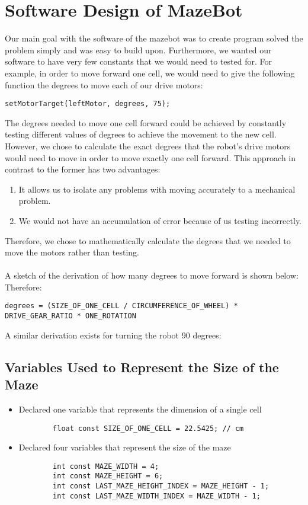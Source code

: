 \documentclass[11pt]{article}
\begin{document}
\section{Software Design of MazeBot}
Our main goal with the software of the mazebot was to create program solved the problem simply and was easy to build upon. Furthermore, we wanted our software to have very few constants that we would need to tested for. For example, in order to move forward one cell, we would need to give the following function the degrees to move each of our drive motors:
\begin{verbatim}
setMotorTarget(leftMotor, degrees, 75);
\end{verbatim}
The degrees needed to move one cell forward could be achieved by constantly testing different values of degrees to achieve the movement to the new cell. However, we chose to calculate the exact degrees that the robot's drive motors would need to move in order to move exactly one cell forward. This approach in contrast to the former has two advantages: 
\begin{enumerate}
\item It allows us to isolate any problems with moving accurately to a mechanical problem.
\item We would not have an accumulation of error because of us testing incorrectly.
\end{enumerate}
Therefore, we chose to mathematically calculate the degrees that we needed to move the motors rather than testing.\\\\
A sketch of the derivation of how many degrees to move forward is shown below: %
\\
Therefore:
\begin{verbatim}
degrees = (SIZE_OF_ONE_CELL / CIRCUMFERENCE_OF_WHEEL) * DRIVE_GEAR_RATIO * ONE_ROTATION
\end{verbatim}
A similar derivation exists for turning the robot 90 degrees: %








\subsection{Variables Used to Represent the Size of the Maze}
\begin{itemize}
\item Declared one variable that represents the dimension of a single cell
	\begin{verbatim}
		float const SIZE_OF_ONE_CELL = 22.5425; // cm 	
	\end{verbatim} 
\item Declared four variables that represent the size of the maze
	\begin{verbatim}
		int const MAZE_WIDTH = 4;
		int const MAZE_HEIGHT = 6;
		int const LAST_MAZE_HEIGHT_INDEX = MAZE_HEIGHT - 1;
		int const LAST_MAZE_WIDTH_INDEX = MAZE_WIDTH - 1;
	\end{verbatim} 
\end{itemize}
\end{document}
